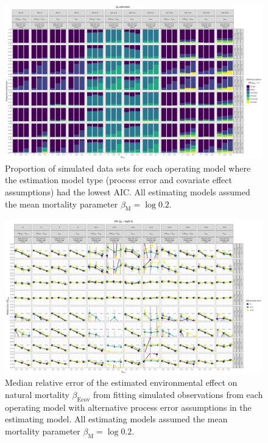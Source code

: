 \documentclass[
  12pt,
]{article}
\begin{document}
\begin{landscape}
\begin{figure}
\caption{Proportion of simulated data sets for each operating model where the estimation model type (process error and covariate effect assumptions) had the lowest AIC. All estimating models assumed the mean mortality parameter $\beta_\text{M} = \log 0.2$.}\label{aic_rank_M_estimated}
\begin{center}
\includegraphics[height = \textheight]{proportion_best_AIC_M_estimated.png}
\end{center}
\end{figure}
\end{landscape}

\begin{landscape}
\begin{figure}
\caption{Median relative error of the estimated environmental effect on natural mortality $\beta_\text{Ecov}$ from fitting simulated observations from each operating model with alternative process error assumptions in the estimating model. All estimating models assumed the mean mortality parameter $\beta_\text{M} = \log 0.2$.}\label{Ecov_beta_bias_M_fixed}
\begin{center}
\includegraphics[height = \textheight]{Ecov_beta_bias_all_PE_effect_M_fixed.png}
\end{center}
\end{figure}
\end{landscape}
\end{document}
